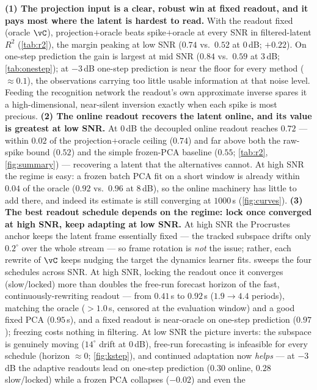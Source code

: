 \documentclass[11pt]{article}
\begin{document}
\textbf{(1) The projection input is a clear, robust win at fixed readout, and it pays most where
the latent is hardest to read.} With the readout fixed (oracle $\vC$), projection$+$oracle beats
spike$+$oracle at every SNR in filtered-latent $R^2$ (\cref{tab:r2}), the margin peaking at low SNR
($0.74$ vs.\ $0.52$ at $0$\,dB; $+0.22$). On one-step prediction the gain is largest at mid SNR
($0.84$ vs.\ $0.59$ at $3$\,dB; \cref{tab:onestep}); at $-3$\,dB one-step prediction is near the
floor for every method ($\approx0.1$), the observations carrying too little usable information at
that noise level. Feeding the recognition network the readout's own approximate inverse spares it a
high-dimensional, near-silent inversion exactly when each spike is most precious.
\textbf{(2) The online readout recovers the latent online, and its value is greatest at low SNR.}
At $0$\,dB the decoupled online readout reaches $0.72$ --- within $0.02$ of the projection$+$oracle
ceiling ($0.74$) and far above both the raw-spike bound ($0.52$) and the simple frozen-PCA baseline
($0.55$; \cref{tab:r2}, \cref{fig:summary}) --- recovering a latent that the alternatives cannot.
At high SNR the regime is easy: a frozen batch PCA fit on a short window is already within $0.04$ of
the oracle ($0.92$ vs.\ $0.96$ at $8$\,dB), so the online machinery has little to add there, and
indeed its estimate is still converging at $1000$\,s (\cref{fig:curves}).
\textbf{(3) The best readout schedule depends on the regime: lock once converged at high SNR, keep
adapting at low SNR.} At high SNR the Procrustes anchor keeps the latent frame essentially fixed ---
the tracked subspace drifts only $0.2^\circ$ over the whole stream --- so frame rotation is
\emph{not} the issue; rather, each rewrite of $\vC$ keeps nudging the target the dynamics learner
fits.  sweeps the four schedules across SNR. At high SNR, locking the readout
once it converges (slow/locked) more than doubles the free-run forecast horizon of the fast,
continuously-rewriting readout --- from $0.41$\,s to $0.92$\,s ($1.9\!\to\!4.4$ periods), matching
the oracle ($>1.0$\,s, censored at the evaluation window) and a good fixed PCA ($0.95$\,s), and a
fixed readout is near-oracle on one-step prediction ($0.97$); freezing costs nothing in filtering.
At low SNR the picture inverts: the subspace is genuinely moving ($14^\circ$ drift at $0$\,dB),
free-run forecasting is infeasible for every schedule (horizon $\approx0$; \cref{fig:kstep}), and
continued adaptation now \emph{helps} --- at $-3$\,dB the adaptive readouts lead on one-step
prediction ($0.30$ online, $0.28$ slow/locked) while a frozen PCA collapses ($-0.02$) and even the
\end{document}
